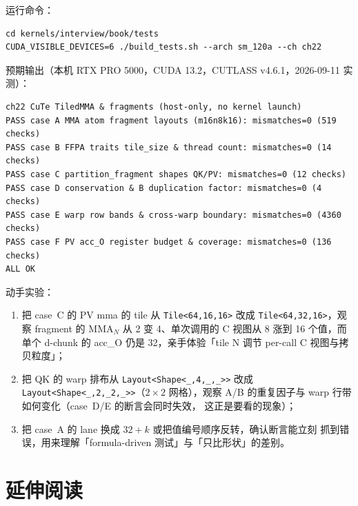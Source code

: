 运行命令：

\begin{lstlisting}[style=console]
cd kernels/interview/book/tests
CUDA_VISIBLE_DEVICES=6 ./build_tests.sh --arch sm_120a --ch ch22
\end{lstlisting}

预期输出（本机 RTX PRO 5000，CUDA 13.2，CUTLASS v4.6.1，2026-09-11 实测）：

\begin{lstlisting}[style=console]
ch22 CuTe TiledMMA & fragments (host-only, no kernel launch)
PASS case A MMA atom fragment layouts (m16n8k16): mismatches=0 (519 checks)
PASS case B FFPA traits tile_size & thread count: mismatches=0 (14 checks)
PASS case C partition_fragment shapes QK/PV: mismatches=0 (12 checks)
PASS case D conservation & B duplication factor: mismatches=0 (4 checks)
PASS case E warp row bands & cross-warp boundary: mismatches=0 (4360 checks)
PASS case F PV acc_O register budget & coverage: mismatches=0 (136 checks)
ALL OK
\end{lstlisting}

动手实验：

\begin{enumerate}
  \item 把 case~C 的 PV mma 的 tile 从 \texttt{Tile\allowbreak{}<64,\allowbreak{}16,\allowbreak{}16>} 改成
        \texttt{Tile\allowbreak{}<64,\allowbreak{}32,\allowbreak{}16>}，观察 fragment 的 $\mathrm{MMA}_N$ 从 2 变
        4、单次调用的 C 视图从 8 涨到 16 个值，而单个 d-chunk 的 acc\_O
        仍是 32，亲手体验「tile N 调节 per-call C 视图与拷贝粒度」；
  \item 把 QK 的 warp 排布从 \texttt{Layout\allowbreak{}<Shape\allowbreak{}<\_\allowbreak{},\allowbreak{}4,\allowbreak{}\_\allowbreak{},\allowbreak{}\_\allowbreak{}>>} 改成
        \texttt{Layout\allowbreak{}<Shape\allowbreak{}<\_\allowbreak{},\allowbreak{}2,\allowbreak{}\_\allowbreak{}2,\allowbreak{}\_\allowbreak{}>>}（$2\times2$ 网格），观察
        A/B 的重复因子与 warp 行带如何变化（case~D/E 的断言会同时失效，
        这正是要看的现象）；
  \item 把 case~A 的 lane 换成 $32+k$ 或把值编号顺序反转，确认断言能立刻
        抓到错误，用来理解「formula-driven 测试」与「只比形状」的差别。
\end{enumerate}

\section*{延伸阅读}

